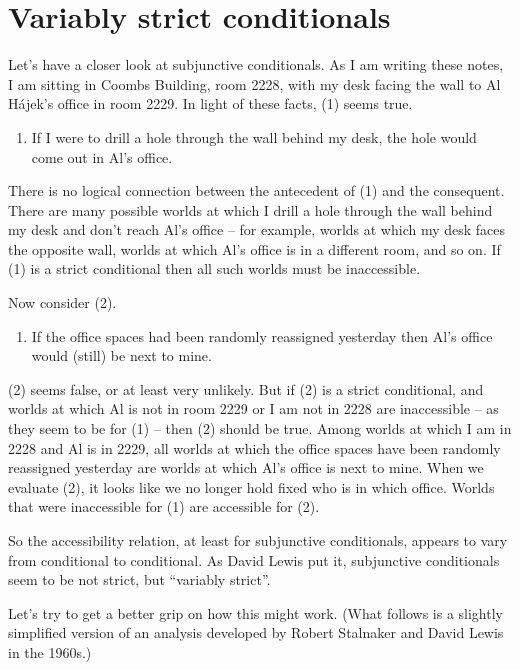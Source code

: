   
\section{Variably strict conditionals}

Let's have a closer look at subjunctive conditionals. As I am writing these
notes, I am sitting in Coombs Building, room 2228, with my desk facing
the wall to Al H\'ajek's office in room 2229. In light of these facts, (1) seems
true.
\begin{enumerate}[leftmargin=10mm]
\item[(1)] If I were to drill a hole through the wall behind my desk,
  the hole would come out in Al's office.
\end{enumerate}
There is no logical connection between the antecedent of (1) and the consequent.
There are many possible worlds at which I drill a hole through the wall behind
my desk and don't reach Al's office -- for example, worlds at which my desk
faces the opposite wall, worlds at which Al's office is in a different room, and
so on. If (1) is a strict conditional then all such worlds must be inaccessible.

Now consider (2).
\begin{enumerate}[leftmargin=10mm]
\item[(2)] If the office spaces had been randomly reassigned yesterday then Al's
  office would (still) be next to mine.
\end{enumerate}
(2) seems false, or at least very unlikely. But if (2) is a strict conditional,
and worlds at which Al is not in room 2229 or I am not in 2228 are inaccessible
-- as they seem to be for (1) -- then (2) should be true. Among worlds at which
I am in 2228 and Al is in 2229, all worlds at which the office spaces have been
randomly reassigned yesterday are worlds at which Al's office is next to mine.
When we evaluate (2), it looks like we no longer hold fixed who is in which
office. Worlds that were inaccessible for (1) are accessible for (2).

So the accessibility relation, at least for subjunctive conditionals, appears to
vary from conditional to conditional. As David Lewis put it, subjunctive
conditionals seem to be not strict, but ``variably strict''.

Let's try to get a better grip on how this might work. (What follows is a
slightly simplified version of an analysis developed by Robert Stalnaker and
David Lewis in the 1960s.)


